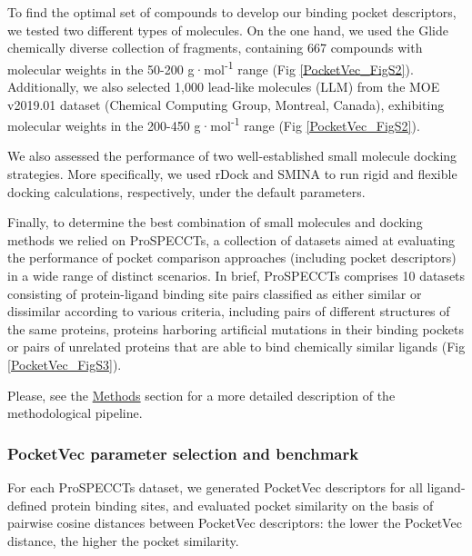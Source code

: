 To find the optimal set of compounds to develop our binding pocket descriptors, we tested two different types of molecules. On the one hand, we used the Glide chemically diverse collection of fragments\cite{friesner_glide_2004, halgren_glide_2004}, containing 667 compounds with molecular weights in the 50-200 g·mol\textsuperscript{-1} range (Fig \ref{PocketVec_FigS2}). Additionally, we also selected 1,000 lead-like molecules (LLM) from the MOE v2019.01 dataset (Chemical Computing Group, Montreal, Canada), exhibiting molecular weights in the 200-450 g·mol\textsuperscript{-1} range (Fig \ref{PocketVec_FigS2}).

We also assessed the performance of two well-established small molecule docking strategies. More specifically, we used rDock\cite{ruiz-carmona_rdock_2014} and SMINA\cite{koes_lessons_2013} to run rigid and flexible docking calculations, respectively, under the default parameters.

Finally, to determine the best combination of small molecules and docking methods we relied on ProSPECCTs, a collection of datasets aimed at evaluating the performance of pocket comparison approaches (including pocket descriptors) in a wide range of distinct scenarios\cite{ehrt_benchmark_2018}. In brief, ProSPECCTs comprises 10 datasets consisting of protein-ligand binding site pairs classified as either similar or dissimilar according to various criteria, including pairs of different structures of the same proteins, proteins harboring artificial mutations in their binding pockets or pairs of unrelated proteins that are able to bind chemically similar ligands (Fig \ref{PocketVec_FigS3}).

Please, see the \hyperref[PocketVec_Methods]{Methods} section for a more detailed description of the methodological pipeline.

\subsubsection{PocketVec parameter selection and benchmark}

For each ProSPECCTs dataset, we generated PocketVec descriptors for all ligand-defined protein binding sites, and evaluated pocket similarity on the basis of pairwise cosine distances between PocketVec descriptors: the lower the PocketVec distance, the higher the pocket similarity. 

